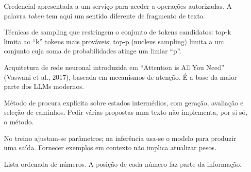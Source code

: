 \begin{description}[style=nextline,leftmargin=0pt,labelindent=0pt,labelsep=0pt,labelwidth=0pt]
\item[Token de acesso] Credencial apresentada a um serviço para aceder a operações autorizadas. A palavra \emph{token} tem aqui um sentido diferente de fragmento de texto.
\item[Top-k / Top-p] Técnicas de sampling que restringem o conjunto de tokens candidatos: top-k limita ao “k” tokens mais prováveis; top-p (nucleus sampling) limita a um conjunto cuja soma de probabilidades atinge um limiar “p”.
\item[Transformer] Arquitetura de rede neuronal introduzida em “Attention is All You Need” (Vaswani et al., 2017), baseada em mecanismos de atenção. É a base da maior parte dos LLMs modernos.
\item[Tree-of-Thought (ToT)] Método de procura explícita sobre estados intermédios, com geração, avaliação e seleção de caminhos. Pedir várias propostas num texto não implementa, por si só, o método.
\item[Treino e inferência] No treino ajustam-se parâmetros; na inferência usa-se o modelo para produzir uma saída. Fornecer exemplos em contexto não implica atualizar pesos.
\item[Vetor] Lista ordenada de números. A posição de cada número faz parte da informação.
\end{description}
